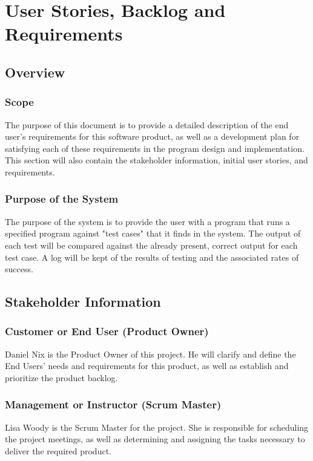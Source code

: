 \chapter{User Stories, Backlog and Requirements}
\section{Overview}


\subsection{Scope}


The purpose of this document is to provide a detailed description of the end user's requirements
for this software product, as well as a development plan for satisfying each of these requirements
in the program design and implementation.  This section will also contain the stakeholder information, 
initial user stories, and requirements. 



\subsection{Purpose of the System}
The purpose of the system is to provide the user with a program that runs a specified program against "test cases" that it finds in the system.  The output of each test will be compared against the already present, correct output for each test case.  A log will be kept of the results of testing and  the associated rates of success.


\section{ Stakeholder Information}


\subsection{Customer or End User (Product Owner)}
Daniel Nix is the Product Owner of this project.  He will clarify and define the End Users' needs and requirements 
for this product, as well as establish and prioritize the product backlog.

\subsection{Management or Instructor (Scrum Master)}
Lisa Woody is the Scrum Master for the project.  She is responsible for scheduling the project meetings, as well as 
determining and assigning the tasks necessary to deliver the required product.

